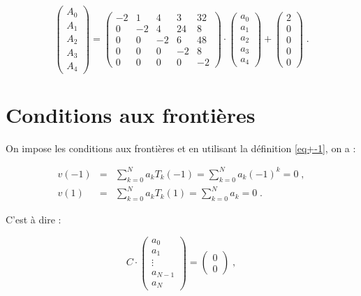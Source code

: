 \documentclass{report}
\begin{document}
\begin{equation}
\begin{pmatrix}
 A_{0}\\ 
 A_{1}\\ 
 A_{2}\\ 
 A_{3}\\ 
 A_{4}
\end{pmatrix} = \begin{pmatrix}
-2 & 1 & 4 & 3 & 32\\ 
0 & -2 & 4 & 24 & 8\\ 
0 & 0 & -2 & 6 & 48\\ 
0 & 0 & 0 & -2 & 8\\ 
0 & 0 & 0 & 0 & -2
\end{pmatrix} \cdot \begin{pmatrix}
 a_0\\ 
 a_1\\ 
 a_2\\ 
 a_3\\ 
 a_4
\end{pmatrix}+\begin{pmatrix}
 2\\ 
 0\\ 
 0\\ 
 0\\ 
 0
\end{pmatrix}\;.
\end{equation}

\section{Conditions aux frontières}

On impose les conditions aux frontières et en utilisant la définition \eqref{eq+-1}, on a :

\begin{eqnarray}
v(-1) &=& \sum_{k=0}^N a_k T_k(-1) = \sum_{k=0}^N a_k (-1)^{k} = 0\;,\\
v(1) &=& \sum_{k=0}^N a_k T_k(1) = \sum_{k=0}^N a_k = 0\;.
\end{eqnarray}

C'est à dire :

\begin{equation}
 C \cdot \begin{pmatrix}
 a_0\\ 
 a_1\\ 
 \vdots\\ 
 a_{N-1}\\ 
 a_{N}
\end{pmatrix}
= \begin{pmatrix}
 0\\  
 0
\end{pmatrix}\;,\label{cf}
\end{equation}
\end{document}
